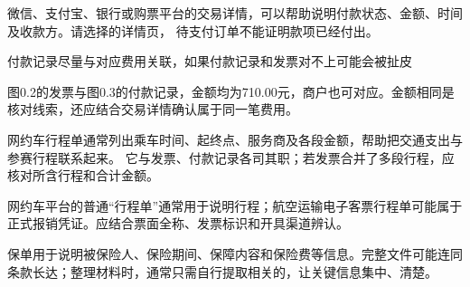 \clearpage
{}
\label{payment}
\par\noindent\begin{minipage}[t]{\dimexpr\linewidth-63mm\relax}\vspace{0pt}
微信、支付宝、银行或购票平台的交易详情，可以帮助说明付款状态、金额、时间及收款方。请选择的详情页，
待支付订单不能证明款项已经付出。

付款记录尽量与对应费用关联，如果付款记录和发票对不上可能会被扯皮

\begin{SideNote}
图0.2的发票与图0.3的付款记录，金额均为710.00元，商户也可对应。金额相同是核对线索，还应结合交易详情确认属于同一笔费用。

\end{SideNote}\end{minipage}\hfill\begin{minipage}[t]{55.5mm}\vspace{-7pt}
\end{minipage}\par
{}
\label{itinerary}
网约车行程单通常列出乘车时间、起终点、服务商及各段金额，帮助把交通支出与参赛行程联系起来。
它与发票、付款记录各司其职；若发票合并了多段行程，应核对所含行程和合计金额。

\begin{SummaryBox}
网约车平台的普通“行程单”通常用于说明行程；航空运输电子客票行程单可能属于正式报销凭证。应结合票面全称、发票标识和开具渠道辨认。

\end{SummaryBox}

\clearpage
{}
\label{insurance}
保单用于说明被保险人、保险期间、保障内容和保险费等信息。完整文件可能连同条款长达；整理材料时，通常只需自行提取相关的，让关键信息集中、清楚。

